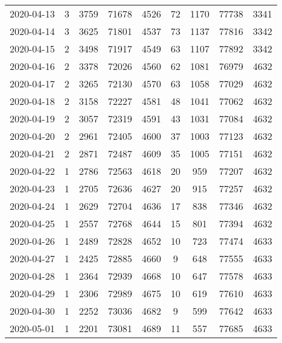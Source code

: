 \begin{longtable}{ccccccccc}
2020-04-13&3&3759&71678&4526&72&1170&77738&3341\\
2020-04-14&3&3625&71801&4537&73&1137&77816&3342\\
2020-04-15&2&3498&71917&4549&63&1107&77892&3342\\
2020-04-16&2&3378&72026&4560&62&1081&76979&4632\\
2020-04-17&2&3265&72130&4570&63&1058&77029&4632\\
2020-04-18&2&3158&72227&4581&48&1041&77062&4632\\
2020-04-19&2&3057&72319&4591&43&1031&77084&4632\\
2020-04-20&2&2961&72405&4600&37&1003&77123&4632\\
2020-04-21&2&2871&72487&4609&35&1005&77151&4632\\
2020-04-22&1&2786&72563&4618&20&959&77207&4632\\
2020-04-23&1&2705&72636&4627&20&915&77257&4632\\
2020-04-24&1&2629&72704&4636&17&838&77346&4632\\
2020-04-25&1&2557&72768&4644&15&801&77394&4632\\
2020-04-26&1&2489&72828&4652&10&723&77474&4633\\
2020-04-27&1&2425&72885&4660&9&648&77555&4633\\
2020-04-28&1&2364&72939&4668&10&647&77578&4633\\
2020-04-29&1&2306&72989&4675&10&619&77610&4633\\
2020-04-30&1&2252&73036&4682&9&599&77642&4633\\
2020-05-01&1&2201&73081&4689&11&557&77685&4633\\
\hline
\end{longtable}